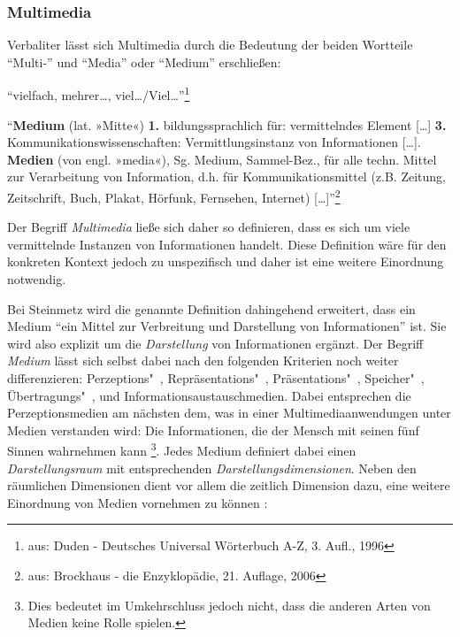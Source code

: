 \subsubsection{Multimedia} %
\label{ssub:definition_multimedia}
  
  Verbaliter lässt sich Multimedia durch die Bedeutung der beiden Wortteile "`Multi-"' und "`Media"' oder "`Medium"' erschließen:

  \begin{definition}[Multi-]\label{def:multi_}
    "`vielfach, mehrer\ldots, viel\ldots/Viel\ldots"'\footnote{aus: Duden - Deutsches Universal Wörterbuch A-Z, 3. Aufl., 1996}
  \end{definition}
  
  \begin{definition}\label{def:medium}
    "`\textbf{Medium} (lat. »Mitte«) \textbf{1.} bildungssprachlich für: vermittelndes Element [\ldots] \textbf{3.} Kommunikationswissenschaften: Vermittlungsinstanz von Informationen [\ldots]. \textbf{Medien} (von engl. »media«), Sg. Medium, Sammel-Bez., für alle techn. Mittel zur Verarbeitung von Information, d.h. für Kommunikationsmittel (z.B. Zeitung, Zeitschrift, Buch, Plakat, Hörfunk, Fernsehen, Internet) [\ldots]"'\footnote{aus: Brockhaus - die Enzyklopädie, 21. Auflage, 2006}
  \end{definition}
  
  Der Begriff \emph{Multimedia} ließe sich daher so definieren, dass es sich um viele vermittelnde Instanzen von Informationen handelt. Diese Definition wäre für den konkreten Kontext jedoch zu unspezifisch und daher ist eine weitere Einordnung notwendig.
  
  Bei Steinmetz wird die genannte Definition dahingehend erweitert, dass ein Medium "`ein Mittel zur Verbreitung und Darstellung von Informationen"' \citep[S. 7]{multimedia_technologie} ist. Sie wird also explizit um die \emph{Darstellung} von Informationen ergänzt. Der Begriff \emph{Medium} lässt sich selbst dabei nach den folgenden Kriterien noch weiter differenzieren: Perzeptions"~, Repräsentations"~, Präsentations"~, Speicher"~, Übertragungs"~, und Informationsaustauschmedien. Dabei entsprechen die Perzeptionsmedien am nächsten dem, was in einer Multimediaanwendungen unter Medien verstanden wird: Die Informationen, die der Mensch mit seinen fünf Sinnen wahrnehmen kann \citep[S. 9]{multimedia_technologie}\footnote{Dies bedeutet im Umkehrschluss jedoch nicht, dass die anderen Arten von Medien keine Rolle spielen.}. Jedes Medium definiert dabei einen \emph{Darstellungsraum} mit entsprechenden \emph{Darstellungsdimensionen}. Neben den räumlichen Dimensionen dient vor allem die zeitlich Dimension dazu, eine weitere Einordnung von Medien vornehmen zu können \citep[S. 10]{multimedia_technologie}:
  
